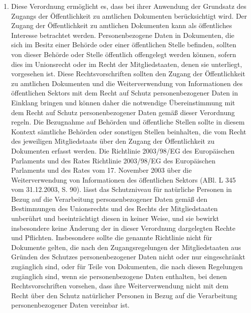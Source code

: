 \begin{enumerate}
   \item Diese Verordnung ermöglicht es, dass bei ihrer Anwendung der Grundsatz des Zugangs der Öffentlichkeit zu
    amtlichen Dokumenten berücksichtigt wird. Der Zugang der Öffentlichkeit zu amtlichen Dokumenten kann als
    öffentliches Interesse betrachtet werden. Personenbezogene Daten in Dokumenten, die sich im Besitz einer Behörde
    oder einer öffentlichen Stelle befinden, sollten von dieser Behörde oder Stelle öffentlich offengelegt werden
    können, sofern dies im Unionsrecht oder im Recht der Mitgliedstaaten, denen sie unterliegt, vorgesehen ist. Diese
    Rechtsvorschriften sollten den Zugang der Öffentlichkeit zu amtlichen Dokumenten und die Weiterverwendung von
    Informationen des öffentlichen Sektors mit dem Recht auf Schutz personenbezogener Daten in Einklang bringen und
    können daher die notwendige Übereinstimmung mit dem Recht auf Schutz personenbezogener Daten gemäß dieser
    Verordnung regeln. Die Bezugnahme auf Behörden und öffentliche Stellen sollte in diesem Kontext sämtliche Behörden
    oder sonstigen Stellen beinhalten, die vom Recht des jeweiligen Mitgliedstaats über den Zugang der Öffentlichkeit
    zu Dokumenten erfasst werden. Die Richtlinie 2003/98/EG des Europäischen Parlaments und des Rates\comment
    {Richtlinie 2003/98/EG des Europäischen Parlaments und des Rates vom 17. November 2003 über die Weiterverwendung
    von Informationen des öffentlichen Sektors (ABl. L 345 vom 31.12.2003, S. 90).} lässt das Schutzniveau für
    natürliche Personen in Bezug auf die Verarbeitung personenbezogener Daten gemäß den Bestimmungen des Unionsrechts
    und des Rechts der Mitgliedstaaten unberührt und beeinträchtigt diesen in keiner Weise, und sie bewirkt
    insbesondere keine Änderung der in dieser Verordnung dargelegten Rechte und Pflichten. Insbesondere sollte die
    genannte Richtlinie nicht für Dokumente gelten, die nach den Zugangsregelungen der Mitgliedstaaten aus Gründen des
    Schutzes personenbezogener Daten nicht oder nur eingeschränkt zugänglich sind, oder für Teile von Dokumenten, die
    nach diesen Regelungen zugänglich sind, wenn sie personenbezogene Daten enthalten, bei denen Rechtsvorschriften
    vorsehen, dass ihre Weiterverwendung nicht mit dem Recht über den Schutz natürlicher Personen in Bezug auf die
    Verarbeitung personenbezogener Daten vereinbar ist.%
   \label{eg:154}
   


\end{enumerate}
